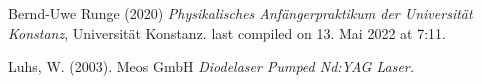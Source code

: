 \documentclass[../main.tex]{subfiles}
\begin{document}
	\begin{thebibliography}{99}
		 Bernd-Uwe Runge (2020) \emph{Physikalisches Anfängerpraktikum der Universität Konstanz}, Universität Konstanz. last compiled on 13. Mai 2022 at 7:11. 

         Luhs, W. (2003). Meos GmbH
        \emph{Diodelaser Pumped Nd:YAG Laser.}



  
		
	\end{thebibliography}
\end{document}
